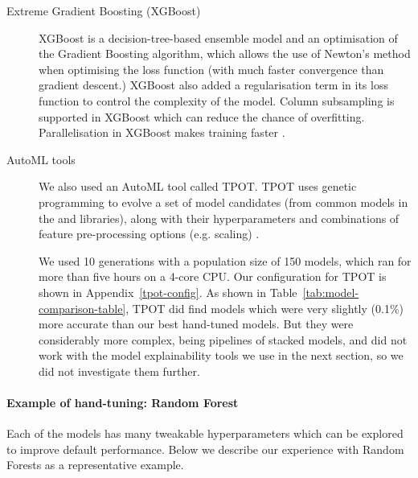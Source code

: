 \begin{description}
\item[Extreme Gradient Boosting (XGBoost)] XGBoost is a decision-tree-based ensemble model and an optimisation of the Gradient Boosting algorithm, which allows the use of Newton's method when optimising the loss function (with much faster convergence than gradient descent.) XGBoost also added a regularisation term in its loss function to control the complexity of the model. Column subsampling is supported in XGBoost which can reduce the chance of overfitting. Parallelisation in XGBoost makes training faster \cite{chen2016xgboost} .

\item[AutoML tools]
\label{sec:automl}
We also used an AutoML tool called TPOT. TPOT uses genetic programming to evolve a set of model candidates (from common models in the  and  libraries), along with their hyperparameters and combinations of feature pre-processing options (e.g. scaling) \cite{tpot-automl}. 

We used 10 generations with a population size of 150 models, which ran for more than five hours on a 4-core CPU. Our configuration for TPOT is shown in Appendix\ \ref{tpot-config}. As shown in Table\ \ref{tab:model-comparison-table}, TPOT did find models which were very slightly (0.1\%) more accurate than our best hand-tuned models. But they were considerably more complex, being pipelines of stacked models, and did not work with the model explainability tools we use in the next section, so we did not investigate them further.
\end{description}

\paragraph{Example of hand-tuning: Random Forest}
Each of the models has many tweakable hyperparameters which can be explored to improve default performance. Below we describe our experience with Random Forests as a representative example. 

